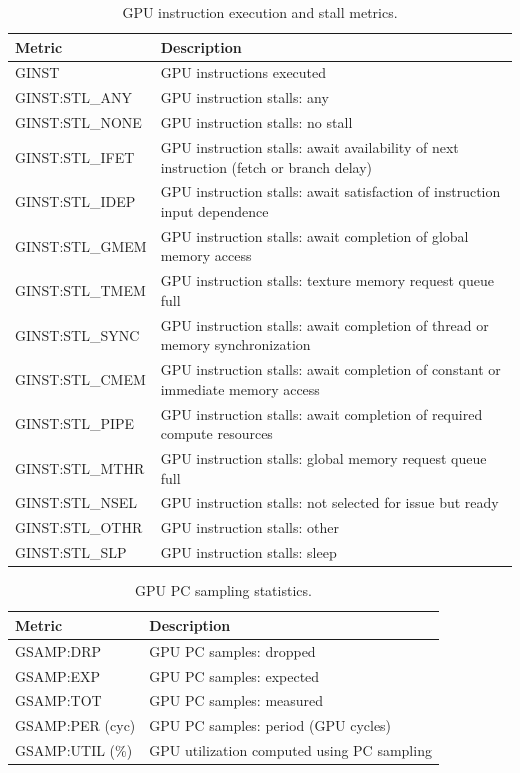 \begin{table}[t]
\centering
\begin{tabular}{|l|p{3.5in}|}\hline
Metric & Description\\\hline\hline
GINST & GPU instructions executed\\\hline
GINST:STL\_ANY  &  GPU instruction stalls: any  \\\hline 
 GINST:STL\_NONE  &  GPU instruction stalls: no stall  \\\hline 
 GINST:STL\_IFET  &  GPU instruction stalls: await availability of next    instruction (fetch or branch delay)  \\\hline 
 GINST:STL\_IDEP  &  GPU instruction stalls: await satisfaction of instruction    input dependence  \\\hline 
 GINST:STL\_GMEM  &  GPU instruction stalls: await completion of global memory    access  \\\hline 
 GINST:STL\_TMEM  &  GPU instruction stalls: texture memory request queue full  \\\hline 
 GINST:STL\_SYNC  &  GPU instruction stalls: await completion of thread or    memory synchronization  \\\hline 
 GINST:STL\_CMEM  &  GPU instruction stalls: await completion of constant or    immediate memory access  \\\hline 
 GINST:STL\_PIPE  &  GPU instruction stalls: await completion of required    compute resources  \\\hline 
 GINST:STL\_MTHR  &  GPU instruction stalls: global memory request queue full  \\\hline 
 GINST:STL\_NSEL  &  GPU instruction stalls: not selected for issue but ready  \\\hline 
 GINST:STL\_OTHR  &  GPU instruction stalls: other  \\\hline 
 GINST:STL\_SLP  &  GPU instruction stalls: sleep  \\\hline 
\end{tabular}
\caption{GPU instruction execution and stall metrics.}
\label{table:pc-stall}
\end{table}

\begin{table}[t]
\centering
\begin{tabular}{|l|l|}\hline
Metric & Description\\\hline\hline
 GSAMP:DRP  &  GPU PC samples: dropped  \\\hline 
  GSAMP:EXP  &  GPU PC samples: expected  \\\hline 
  GSAMP:TOT  &  GPU PC samples: measured  \\\hline 
  GSAMP:PER (cyc)  &  GPU PC samples: period (GPU cycles)  \\\hline 
  GSAMP:UTIL (\%) & GPU utilization computed using PC sampling\\\hline
\end{tabular}
\caption{GPU PC sampling statistics.}
\label{table:gsamp}
\end{table}



